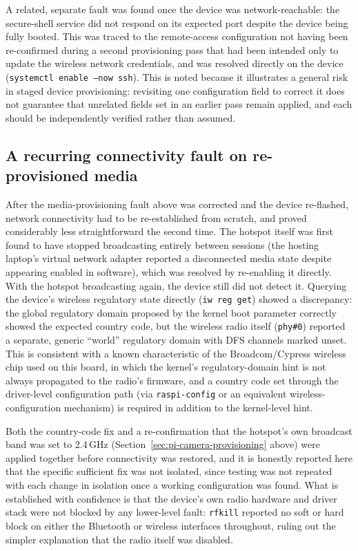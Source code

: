 A related, separate fault was found once the device was network-reachable: the secure-shell service did not respond on its expected port despite the device being fully booted. This was traced to the remote-access configuration not having been re-confirmed during a second provisioning pass that had been intended only to update the wireless network credentials, and was resolved directly on the device (\texttt{systemctl enable --now ssh}). This is noted because it illustrates a general risk in staged device provisioning: revisiting one configuration field to correct it does not guarantee that unrelated fields set in an earlier pass remain applied, and each should be independently verified rather than assumed.

\subsection{A recurring connectivity fault on re-provisioned media}

After the media-provisioning fault above was corrected and the device re-flashed, network connectivity had to be re-established from scratch, and proved considerably less straightforward the second time. The hotspot itself was first found to have stopped broadcasting entirely between sessions (the hosting laptop's virtual network adapter reported a disconnected media state despite appearing enabled in software), which was resolved by re-enabling it directly. With the hotspot broadcasting again, the device still did not detect it. Querying the device's wireless regulatory state directly (\texttt{iw reg get}) showed a discrepancy: the global regulatory domain proposed by the kernel boot parameter correctly showed the expected country code, but the wireless radio itself (\texttt{phy\#0}) reported a separate, generic ``world'' regulatory domain with DFS channels marked unset. This is consistent with a known characteristic of the Broadcom/Cypress wireless chip used on this board, in which the kernel's regulatory-domain hint is not always propagated to the radio's firmware, and a country code set through the driver-level configuration path (via \texttt{raspi-config} or an equivalent wireless-configuration mechanism) is required in addition to the kernel-level hint.

Both the country-code fix and a re-confirmation that the hotspot's own broadcast band was set to 2.4\,GHz (Section~\ref{sec:pi-camera-provisioning} above) were applied together before connectivity was restored, and it is honestly reported here that the specific sufficient fix was not isolated, since testing was not repeated with each change in isolation once a working configuration was found. What is established with confidence is that the device's own radio hardware and driver stack were not blocked by any lower-level fault: \texttt{rfkill} reported no soft or hard block on either the Bluetooth or wireless interfaces throughout, ruling out the simpler explanation that the radio itself was disabled.

